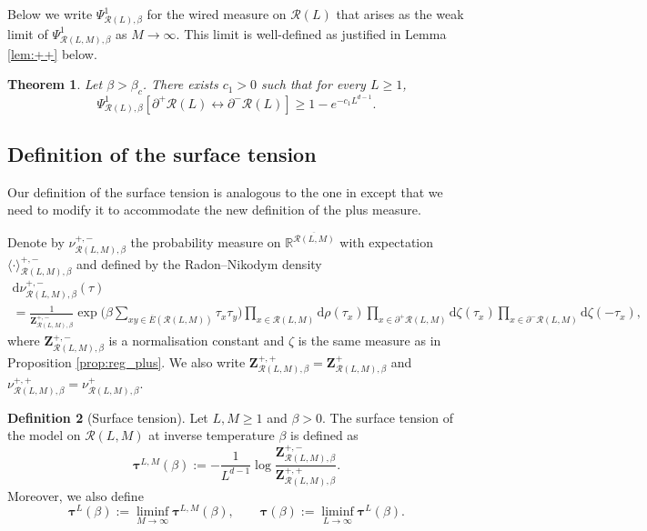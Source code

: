 \documentclass[11pt,a4paper]{article}
\numberwithin{equation}{section}
\theoremstyle{plain}
\newtheorem{Thm}{Theorem}[section]
\theoremstyle{definition}
\newtheorem{Def}[Thm]{Definition}
\begin{document}
Below we write $\Psi^{1}_{\mathcal R(L),\beta}$ for the wired measure on $\mathcal R(L)$ that arises as the weak limit of $\Psi^{1}_{\mathcal R(L,M),\beta}$ as $M\to\infty$. This limit is well-defined as justified in Lemma \ref{lem:++} below. 


\begin{Thm}\label{thm: wired disconnection}
Let $\beta>\beta_c$. There exists $c_1>0$ such that for every $L \geq 1$,
\begin{equation}\label{eq: proba strip}
\Psi^{1}_{\mathcal R(L),\beta}[ \partial^+\mathcal{R}(L)\longleftrightarrow\partial^-\mathcal{R}(L)] \geq 1 - e^{-c_1L^{d-1}}.
\end{equation}
\end{Thm}


\subsection{Definition of the surface tension}


Our definition of the surface tension is analogous to the one in \cite{gunaratnam2025supercritical} except that we need to modify it to accommodate the new definition of the plus measure.

Denote by $\nu^{+,-}_{\mathcal{R}(L,M),\beta}$ the probability measure on $\mathbb R^{\overline{\mathcal{R}(L,M)}}$ with expectation $\langle \cdot \rangle^{+,-}_{\mathcal{R}(L,M),\beta}$ and defined by the Radon--Nikodym density
\begin{multline}
\mathrm{d}\nu^{+,-}_{\mathcal{R}(L,M),\beta}(\tau) \\= \frac{1}{\mathbf{Z}^{+,-}_{\mathcal{R}(L,M),\beta}} \exp\Big(\beta \sum_{xy\in \overline E(\mathcal{R}(L,M))} \tau_x \tau_y
\Big)\prod_{x\in \mathcal{R}(L,M)}\mathrm{d}\rho(\tau_x) \prod_{x \in \partial^+ \mathcal{R}(L,M)} \mathrm{d}\zeta (\tau_x) \prod_{x \in \partial^- \mathcal{R}(L,M)} \mathrm{d}\zeta (-\tau_x),
\end{multline}
where $\mathbf{Z}^{+,-}_{\mathcal{R}(L,M),\beta}$ is a normalisation constant and $\zeta$ is the same measure as in Proposition \ref{prop:reg_plus}. We also write $\mathbf{Z}^{+,+}_{\mathcal{R}(L,M),\beta}=\mathbf{Z}^{+}_{\mathcal{R}(L,M),\beta}$ and $\nu^{+,+}_{\mathcal{R}(L,M),\beta}=\nu^{+}_{\mathcal{R}(L,M),\beta}$.

\begin{Def}[Surface tension] Let $L,M\geq 1$ and $\beta>0$. The surface tension of the model on $\mathcal{R}(L,M)$ at inverse temperature $\beta$ is defined as
\begin{equation}
    \boldsymbol{\tau}^{L,M}(\beta):=-\frac{1}{L^{d-1}}\log  \frac{\mathbf{Z}^{+,-}_{\mathcal{R}(L,M),\beta}}{\mathbf{Z}^{+,+}_{\mathcal{R}(L,M),\beta}}.
\end{equation}
Moreover, we also define
\begin{equation}
    \boldsymbol{\tau}^L(\beta):=\liminf_{M\rightarrow \infty}\boldsymbol{\tau}^{L,M}(\beta), \qquad \boldsymbol{\tau}(\beta):=\liminf_{L\rightarrow \infty}\boldsymbol{\tau}^{L}(\beta).
\end{equation}
\end{Def}
\end{document}
